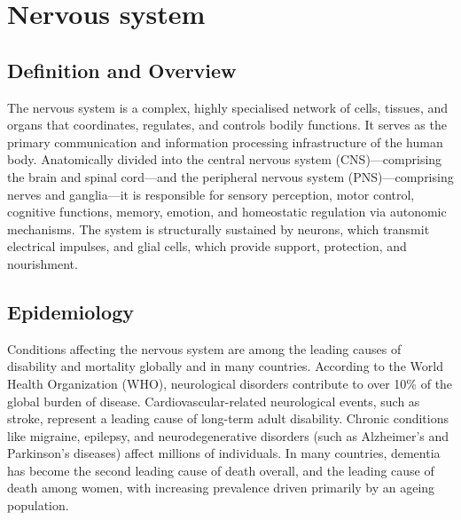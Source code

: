 \chapter{Nervous system}

\section*{Definition and Overview}
The nervous system is a complex, highly specialised network of cells, tissues, and organs that coordinates, regulates, and controls bodily functions. It serves as the primary communication and information processing infrastructure of the human body. Anatomically divided into the central nervous system (CNS)---comprising the brain and spinal cord---and the peripheral nervous system (PNS)---comprising nerves and ganglia---it is responsible for sensory perception, motor control, cognitive functions, memory, emotion, and homeostatic regulation via autonomic mechanisms. The system is structurally sustained by neurons, which transmit electrical impulses, and glial cells, which provide support, protection, and nourishment.

\section*{Epidemiology}
Conditions affecting the nervous system are among the leading causes of disability and mortality globally and in many countries. According to the World Health Organization (WHO), neurological disorders contribute to over 10\% of the global burden of disease. Cardiovascular-related neurological events, such as stroke, represent a leading cause of long-term adult disability. Chronic conditions like migraine, epilepsy, and neurodegenerative disorders (such as Alzheimer's and Parkinson's diseases) affect millions of individuals. In many countries, dementia has become the second leading cause of death overall, and the leading cause of death among women, with increasing prevalence driven primarily by an ageing population.

